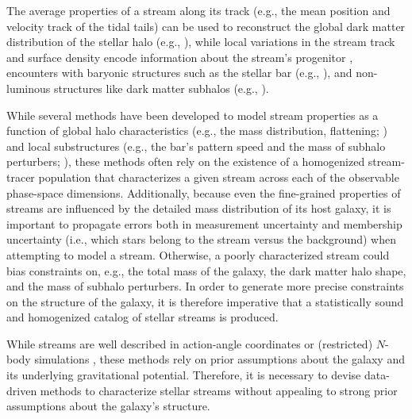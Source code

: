 \documentclass[twocolumn, linenumbers]{aastex631}
\begin{document}
    The average properties of a stream along its track (e.g., the mean position and velocity
    track of the tidal tails) can be used to reconstruct the global dark matter
    distribution of the stellar halo (e.g., \citealt{Johnston+1999, Bonaca+2014,
    Bovy2014, Bovy+2016, Nibauer+2022, Koposov+2023}), while local variations in
    the stream track and surface density encode information about the stream's
    progenitor \citep{Kupper+2012, Sanders+2013, Price-Whelan+2014}, encounters
    with baryonic structures such as the stellar bar (e.g., \citealt{Erkal+2017,
    Pearson+2017}), and non-luminous structures like dark matter subhalos (e.g.,
    \citealt{Ibata+2002, Johnston+2002, Carlberg+2012-74820C, Bovy+2017,
    Bonaca+2019, Hermans+2021}).

    While several methods have been developed to model stream properties as a
    function of global halo characteristics (e.g., the mass distribution,
    flattening; \citealt{Johnston+1999, Binney2008, Koposov+2010,
    SandersBinney2013, Bovy2014, Nibauer+2022}) and local substructures (e.g.,
    the bar's pattern speed and the mass of subhalo perturbers;
    \citealt{Antoja+2014, Hattori+2016, Price-Whelan+2016, Bovy+2017,
    Pearson+2017, Bonaca+2019, Malhan+2021}), these methods often rely on the existence of a
    homogenized stream-tracer population that characterizes a given stream
    across each of the observable phase-space dimensions.  Additionally, because
    even the fine-grained properties of streams are influenced by the detailed
    mass distribution of its host galaxy, it is important to propagate errors
    both in measurement uncertainty and membership uncertainty (i.e., which
    stars belong to the stream versus the background) when attempting to model a
    stream. Otherwise, a poorly characterized stream could bias constraints on,
    e.g., the total mass of the galaxy, the dark matter halo shape, and the mass
    of subhalo perturbers.  In order to generate more precise constraints on the
    structure of the galaxy, it is therefore imperative that a statistically
    sound and homogenized catalog of stellar streams is produced. 

    While streams are well described in action-angle coordinates
    \citep[e.g.][]{Bovy2014} or (restricted) $N$-body simulations
    \citep[e.g.][]{Dehnen+2004}, these methods rely on prior assumptions about
    the galaxy and its underlying gravitational potential.  Therefore, it is
    necessary to devise data-driven methods to characterize stellar streams
    without appealing to strong prior assumptions about the galaxy's structure. 
    
\end{document}
